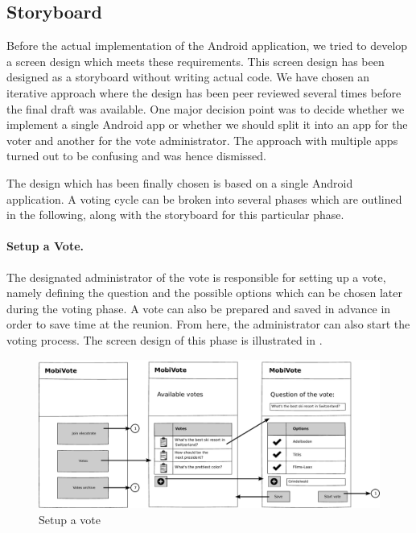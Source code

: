 \documentclass[numbers=noenddot, abstract=on, a4paper, headsepline,
footsepline, oneside, draft=off]{scrreprt}
\begin{document}
\subsection{Storyboard}
Before the actual implementation of the Android application, we tried to develop
a screen design which meets these requirements. This screen design has been
designed as a storyboard without writing actual code. We have chosen an
iterative approach where the design has been peer reviewed several times before
the final draft was available. One major decision point was to decide whether we
implement a single Android app or whether we should split it into an app for the
voter and another for the vote administrator. The approach with multiple apps
turned out to be confusing and was hence dismissed.

The design which has been finally chosen is based on a single Android
application. A voting cycle can be broken into several phases which are outlined
in the following, along with the storyboard for this particular phase.

\paragraph{Setup a Vote.}
The designated administrator of the vote is responsible for setting up a vote,
namely defining the question and the possible options which can be chosen later
during the voting phase. A vote can also be prepared and saved in advance in
order to save time at the reunion. From here, the administrator can also
start the voting process. The screen design of this phase is illustrated in
.



\begin{figure}[htb]
	\centering
	\includegraphics[height=.3\textheight]{img/storyboard/vote_setup}
	\caption{Setup a vote}
	\label{fig:vote_setup}
\end{figure}
\end{document}
